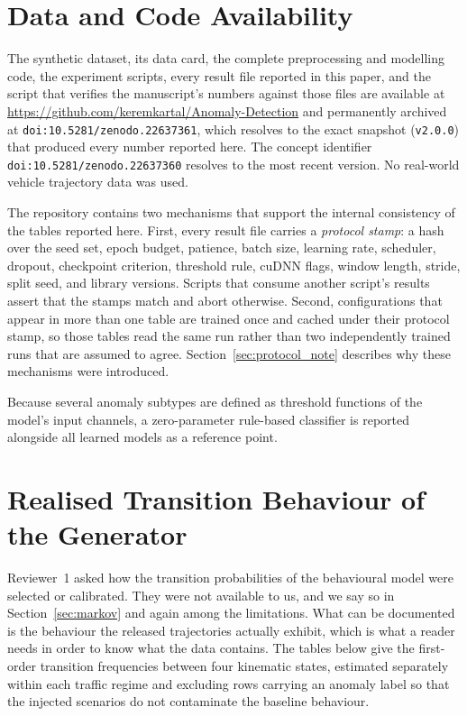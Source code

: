 \documentclass[journal]{IEEEtran}
\newcommand{\repourl}{https://github.com/keremkartal/Anomaly-Detection}
\newcommand{\zenododoi}{10.5281/zenodo.22637361}
\newcommand{\zenodoconcept}{10.5281/zenodo.22637360}
\begin{document}
\section*{Data and Code Availability}
\label{sec:availability}
The synthetic dataset, its data card, the complete preprocessing and modelling code, the experiment scripts, every result file reported in this paper, and the script that verifies the manuscript's numbers against those files are available at \url{\repourl} and permanently archived at \texttt{doi:\zenododoi}, which resolves to the exact snapshot (\texttt{v2.0.0}) that produced every number reported here. The concept identifier \texttt{doi:\zenodoconcept} resolves to the most recent version. No real-world vehicle trajectory data was used.

The repository contains two mechanisms that support the internal consistency of the tables reported here. First, every result file carries a \emph{protocol stamp}: a hash over the seed set, epoch budget, patience, batch size, learning rate, scheduler, dropout, checkpoint criterion, threshold rule, cuDNN flags, window length, stride, split seed, and library versions. Scripts that consume another script's results assert that the stamps match and abort otherwise. Second, configurations that appear in more than one table are trained once and cached under their protocol stamp, so those tables read the same run rather than two independently trained runs that are assumed to agree. Section~\ref{sec:protocol_note} describes why these mechanisms were introduced.

Because several anomaly subtypes are defined as threshold functions of the model's input channels, a zero-parameter rule-based classifier is reported alongside all learned models as a reference point.

\appendices
\section{Realised Transition Behaviour of the Generator}
\label{app:markov}
Reviewer~1 asked how the transition probabilities of the behavioural model were selected or calibrated. They were not available to us, and we say so in Section~\ref{sec:markov} and again among the limitations. What can be documented is the behaviour the released trajectories actually exhibit, which is what a reader needs in order to know what the data contains. The tables below give the first-order transition frequencies between four kinematic states, estimated separately within each traffic regime and excluding rows carrying an anomaly label so that the injected scenarios do not contaminate the baseline behaviour.
\end{document}
